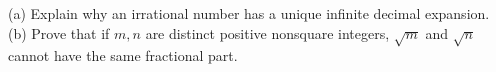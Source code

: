 (a) Explain why an irrational number has a unique infinite decimal expansion. (b) Prove that if $m,n$ are distinct positive nonsquare integers, $\sqrt m$ and $\sqrt n$ cannot have the same fractional part.
